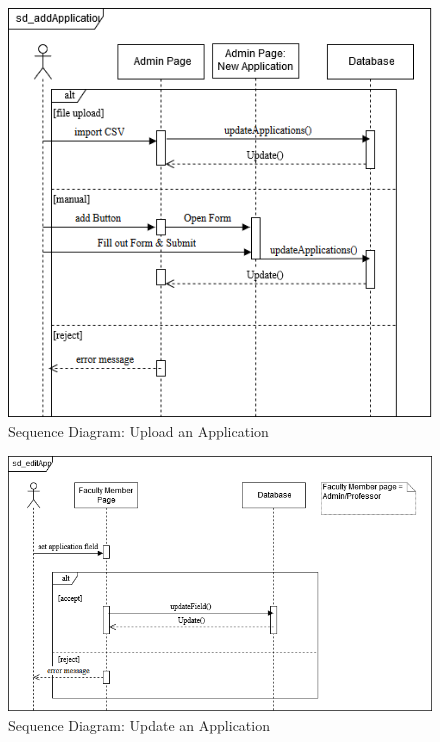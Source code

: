 \documentclass[fontsize=12pt,paper=letter,twoside]{scrartcl}
\begin{document}
\begin{figure}[!htb]
\begin{center}
\includegraphics[width=.99\textwidth]{images/sd_addApplication.png}
\end{center}
\caption{Sequence Diagram: Upload an Application}
\label{fig:sd_add_application}
\end{figure}

\begin{figure}[!htb]
\begin{center}
\includegraphics[width=.99\textwidth]{images/sd_editApp.png}
\end{center}
\caption{Sequence Diagram: Update an Application}
\label{fig:sd_update_application}
\end{figure}
\end{document}

